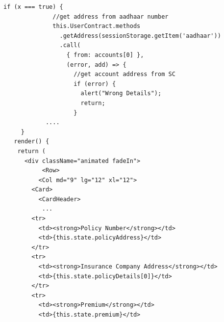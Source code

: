     \begin{lstlisting}[frame=single]  
            if (x === true) {
              //get address from aadhaar number
              this.UserContract.methods
                .getAddress(sessionStorage.getItem('aadhaar'))
                .call(
                  { from: accounts[0] },
                  (error, add) => {
                    //get account address from SC
                    if (error) {
                      alert("Wrong Details");
                      return;
                    }    
            ....    
     }
   render() {   
    return (
      <div className="animated fadeIn">         
           <Row>
          <Col md="9" lg="12" xl="12">
        <Card>    
          <CardHeader>
           ...
        <tr>
          <td><strong>Policy Number</strong></td>
          <td>{this.state.policyAddress}</td>
        </tr>
        <tr>
          <td><strong>Insurance Company Address</strong></td>
          <td>{this.state.policyDetails[0]}</td>
        </tr>
        <tr>
          <td><strong>Premium</strong></td>
          <td>{this.state.premium}</td>
             \end{lstlisting}
